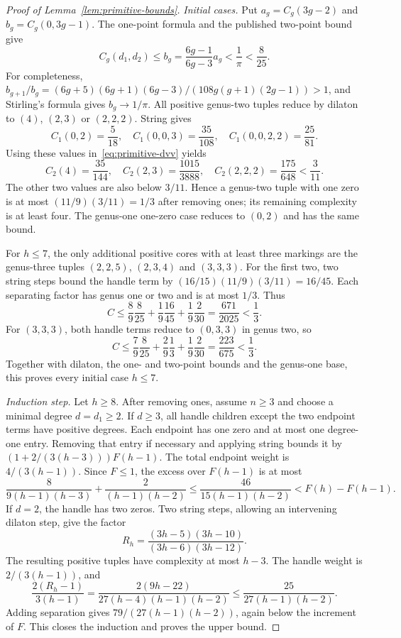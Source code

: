 \begin{proof}[Proof of Lemma~\ref{lem:primitive-bounds}]
\emph{Initial cases.}
Put $a_g=C_g(3g-2)$ and $b_g=C_g(0,3g-1)$.
The one-point formula and the published two-point bound give
\[
 C_g(d_1,d_2)\le b_g=\frac{6g-1}{6g-3}a_g<\frac1\pi<\frac8{25}.
\]
For completeness, $b_{g+1}/b_g=(6g+5)(6g+1)(6g-3)/
(108g(g+1)(2g-1))>1$, and Stirling's formula gives $b_g\to1/\pi$.
All positive genus-two tuples reduce by dilaton to $(4)$, $(2,3)$ or
$(2,2,2)$. String gives
\[
 C_1(0,2)=\frac5{18},\quad C_1(0,0,3)=\frac{35}{108},\quad
 C_1(0,0,2,2)=\frac{25}{81}.
\]
Using these values in~\eqref{eq:primitive-dvv} yields
\[
 C_2(4)=\frac{35}{144},\quad C_2(2,3)=\frac{1015}{3888},\quad
 C_2(2,2,2)=\frac{175}{648}<\frac3{11}.
\]
The other two values are also below $3/11$. Hence a genus-two tuple
with one zero is at most $(11/9)(3/11)=1/3$ after removing ones;
its remaining complexity is at least four. The genus-one one-zero
case reduces to $(0,2)$ and has the same bound.

For $h\le7$, the only additional positive cores with at least three
markings are the genus-three tuples $(2,2,5)$, $(2,3,4)$ and $(3,3,3)$.
For the first two, two string steps bound the handle term by
$(16/15)(11/9)(3/11)=16/45$. Each separating factor has genus one
or two and is at most $1/3$. Thus
\[
 C\le\frac89\frac8{25}+\frac19\frac{16}{45}
              +\frac19\frac2{30}=\frac{671}{2025}<\frac13.
\]
For $(3,3,3)$, both handle terms reduce to $(0,3,3)$ in genus two, so
\[
 C\le\frac79\frac8{25}+\frac29\frac13
              +\frac19\frac2{30}=\frac{223}{675}<\frac13.
\]
Together with dilaton, the one- and two-point bounds and the genus-one
base, this proves every initial case $h\le7$.

\emph{Induction step.}
Let $h\ge8$. After removing ones, assume $n\ge3$ and choose a
minimal degree $d=d_1\ge2$. If $d\ge3$, all handle children except
the two endpoint terms have positive degrees. Each endpoint has one
zero and at most one degree-one entry. Removing that entry if necessary
and applying string bounds it by
$(1+2/(3(h-3)))F(h-1)$. The total endpoint weight is $4/(3(h-1))$.
Since $F\le1$, the excess over $F(h-1)$ is at most
\[
 \frac{8}{9(h-1)(h-3)}+\frac2{(h-1)(h-2)}
 \le\frac{46}{15(h-1)(h-2)}<F(h)-F(h-1).
\]
If $d=2$, the handle has two zeros. Two string steps, allowing an
intervening dilaton step, give the factor
\[
 R_h=\frac{(3h-5)(3h-10)}{(3h-6)(3h-12)}.
\]
The resulting positive tuples have complexity at most $h-3$.
The handle weight is $2/(3(h-1))$, and
\[
 \frac{2(R_h-1)}{3(h-1)}
 =\frac{2(9h-22)}{27(h-4)(h-1)(h-2)}
 \le\frac{25}{27(h-1)(h-2)}.
\]
Adding separation gives $79/(27(h-1)(h-2))$, again below the increment
of $F$. This closes the induction and proves the upper bound.
\end{proof}
